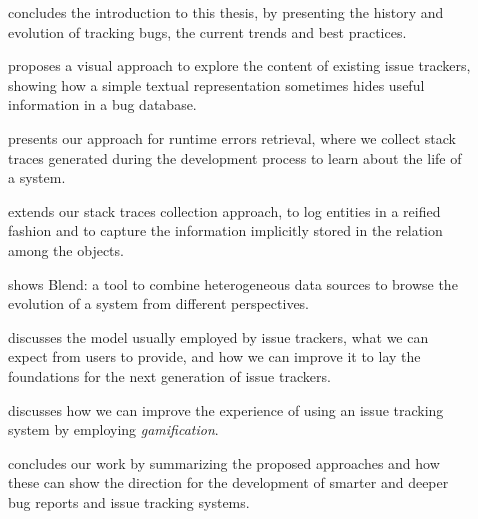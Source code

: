 \begin{description}
 \item[] concludes the introduction to this thesis, by presenting the history and evolution of tracking bugs, the current trends and best practices.


\item[] proposes a visual approach to explore the content of existing issue trackers, showing how a simple textual representation sometimes hides useful information in a bug database.

\item[] presents our approach for runtime errors retrieval, where we collect stack traces generated during the development process to learn about the life of a system.

\item[] extends our stack traces collection approach, to log entities in a reified fashion and to capture the information implicitly stored in the relation among the objects.

\item[] shows Blend: a tool to combine heterogeneous data sources to browse the evolution of a system from different perspectives.

\item[] discusses the model usually employed by issue trackers, what we can expect from users to provide, and how we can improve it to lay the foundations for the next generation of issue trackers.

\item[] discusses how we can improve the experience of using an issue tracking system by employing \emph{gamification}.

\item[] concludes our work by summarizing the proposed approaches and how these can show the direction for the development of smarter and deeper bug reports and issue tracking systems.

\end{description}
